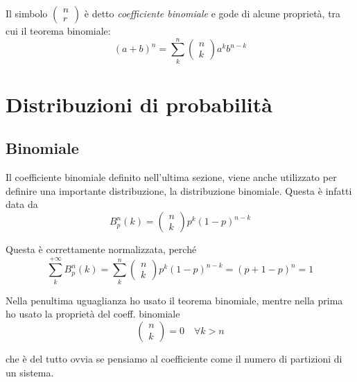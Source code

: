\documentclass{report}
\begin{document}
Il simbolo $\begin{pmatrix} n \\ r \end{pmatrix}$ è detto \emph{coefficiente binomiale} e gode di alcune proprietà, tra cui il teorema binomiale: 
\begin{equation}
    (a+b)^n = \sum_k^n \begin{pmatrix}
        n \\ k
    \end{pmatrix}
    a^k b^{n-k}
\end{equation}

\chapter{Distribuzioni di probabilità}

\section{Binomiale}

Il coefficiente binomiale definito nell'ultima sezione, viene anche utilizzato per definire una importante distribuzione, la distribuzione binomiale. Questa è infatti data da 
\begin{equation}
    B_p^n(k) = \begin{pmatrix}
        n \\ k 
    \end{pmatrix} p^k (1-p)^{n-k}
\end{equation}

Questa è correttamente normalizzata, perché
\begin{equation}
    \sum_k^{+\infty} B_p^n(k) = \sum_k^n \begin{pmatrix}
        n \\ k 
    \end{pmatrix} p^k (1-p)^{n-k} = (p+1-p)^n = 1
\end{equation}

Nella penultima uguaglianza ho usato il teorema binomiale, mentre nella prima ho usato la proprietà del coeff. binomiale 
\begin{equation}
    \begin{pmatrix}
        n \\k
    \end{pmatrix}
    = 0 \quad \forall k> n
\end{equation}

che è del tutto ovvia se pensiamo al coefficiente come il numero di partizioni di un sistema. \\
\end{document}
